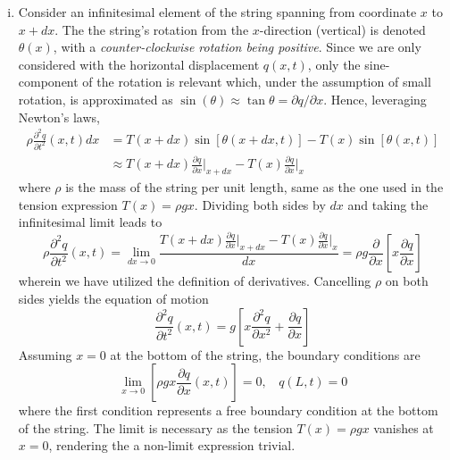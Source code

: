 \begin{enumerate}[(i)]
\item { %
Consider an infinitesimal element of the string spanning from coordinate $x$ to $x + dx$. 
The the string's rotation from the $x$-direction (vertical) is denoted $\theta(x)$, with a \emph{counter-clockwise rotation being positive}. 
Since we are only considered with the horizontal displacement $q(x,t)$, only the sine-component of the rotation is relevant which, under the assumption of small rotation, is approximated as $\sin(\theta) \approx \tan\theta = \partial q / \partial x$.
Hence, leveraging Newton's laws, 
\begin{equation}
\begin{aligned}
    \rho \frac{\partial^2 q}{\partial t^2}(x, t) dx &= T(x + dx) \sin \left[ \theta(x + dx, t) \right] - T(x) \sin \left[\theta(x, t) \right] \\
    &\approx T(x + dx) \frac{\partial q}{\partial x} \Big|_{x+dx} - T(x) \frac{\partial q}{\partial x} \Big|_{x}
\end{aligned}
\end{equation}
where $\rho$ is the mass of the string per unit length, same as the one used in the tension expression $T(x) = \rho g x$.
Dividing both sides by $dx$ and taking the infinitesimal limit leads to 
\begin{equation}
    \rho \frac{\partial^2 q}{\partial t^2}(x, t) = \lim_{dx \rightarrow 0} \frac{T(x + dx) \frac{\partial q}{\partial x} \Big|_{x+dx} - T(x) \frac{\partial q}{\partial x} \Big|_{x}}{dx} = \rho g \frac{\partial}{\partial x} \left[ x \frac{\partial q}{\partial x} \right]
\end{equation}
wherein we have utilized the definition of derivatives. 
Cancelling $\rho$ on both sides yields the equation of motion 
\begin{equation}\label{eqn:hw2_p1_eom}
    \boxed{\frac{\partial^2 q}{\partial t^2}(x, t) = g \left[ x \frac{\partial^2 q}{\partial x^2} + \frac{\partial q}{\partial x} \right]}
\end{equation}
Assuming $x = 0$ at the bottom of the string, the boundary conditions are 
\begin{equation}
    \boxed{\lim_{x \rightarrow 0} \left[\rho g x \frac{\partial q}{\partial x}(x, t)\right] = 0, ~~~~ q(L, t) = 0}
\end{equation}
where the first condition represents a free boundary condition at the bottom of the string. 
The limit is necessary as the tension $T(x) = \rho g x$ vanishes at $x = 0$, rendering the a non-limit expression trivial. 
}
\end{enumerate}

